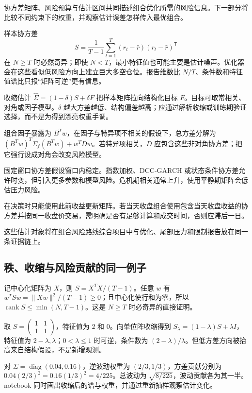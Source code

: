 协方差矩阵、风险预算与估计区间共同描述组合优化所需的风险信息。下一部分将比较不同约束下的权重，并观察估计误差怎样传入最优组合。


样本协方差
\[
S=\frac1{T-1}\sum_{t=1}^T(r_t-\bar r)(r_t-\bar r)^{\mathsf T}
\]
在 $N\ge T$ 时必然奇异；即使 $N<T$，最小特征值也可能主要是估计噪声。优化器会在这些看似低风险方向上建立巨大多空仓位。报告维数比 $N/T$、条件数和特征值谱比只报“矩阵可逆”更有信息。

收缩估计 $\hat\Sigma=(1-\delta)S+\delta F$ 把样本矩阵拉向结构化目标 $F$。目标可取常相关、对角或因子模型。$\delta$ 越大方差越低、结构偏差越高；应通过解析收缩或训练期验证选择，而不是为得到漂亮权重手调。

组合因子暴露为 $B^Tw$，在因子与特异项不相关的假设下，总方差分解为 $(B^Tw)^T\Sigma_f(B^Tw)+w^TDw$。若特异项相关，$D$ 应包含这些非对角协方差；把它强行设成对角会改变风险模型。


固定窗口协方差假设窗口内稳定。指数加权、DCC-GARCH 或状态条件协方差允许时变，但引入更多参数和模型风险。危机期相关通常上升，使用平静期矩阵会低估压力风险。

在决策时只能使用此前收益更新矩阵。若当天收盘组合使用包含当天收盘收益的协方差并按同一收盘价交易，需明确是否有足够计算和成交时间，否则应滞后一日。

这些估计对象将在组合风险路线综合项目中与优化、尾部压力和限制报告放在同一条证据链上。
\subsection{秩、收缩与风险贡献的同一例子}

记中心化矩阵为 $X$，则 $S=X^TX/(T-1)$。任意 $w$ 有 $w^TSw=\|Xw\|^2/(T-1)\geq0$；且中心化使行和为零，所以 $\operatorname{rank}S\leq\min(N,T-1)$。这是 $N\geq T$ 时必奇异的直接证明。

取 $S=\left(\begin{smallmatrix}1&1\\1&1\end{smallmatrix}\right)$，特征值为 2 和 0。向单位阵收缩得到 $S_\lambda=(1-\lambda)S+\lambda I$，特征值为 $2-\lambda,\lambda$；$0<\lambda\leq1$ 时可逆，条件数为 $(2-\lambda)/\lambda$。但低方差方向被抬高来自结构假设，不是新增观测。

对 $\Sigma=\operatorname{diag}(0.04,0.16)$，逆波动权重为 $(2/3,1/3)$，方差贡献分别为 $0.04(2/3)^2=0.16(1/3)^2=4/225$。总波动为 $\sqrt{8/225}$，波动贡献各为其一半。notebook 同时画出收缩后的谱与权重，并通过重新抽样观察估计变化。
